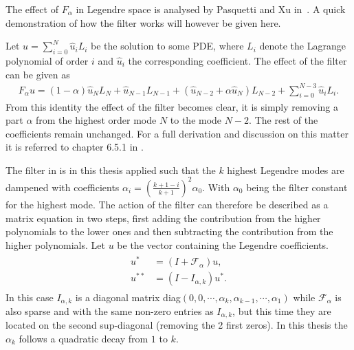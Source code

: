 The effect of $F_{\alpha}$ in Legendre space is analysed
by Pasquetti and Xu in~\cite{Pasquetti}. A quick demonstration of 
how the filter works will however be given here. 

Let $u = \sum_{i=0}^{N} \hat{u}_i L_i$ be the solution to some PDE, where $L_i$ denote the Lagrange
polynomial of order $i$ and $\hat{u}_i$ the corresponding coefficient. The effect of the filter
can be given as 
%
\begin{align}
    F_{\alpha} u = 
    (1-\alpha)\hat{u}_{N}L_{N}
    +\hat{u}_{N-1}L_{N-1} +
    (\hat{u}_{N-2}+\alpha \hat{u}_{N})L_{N-2}
    +\sum_{i=0}^{N-3}\hat{u}_{i}L_{i}.
    \label{eq:filtereffect}
\end{align}
%
From this identity the effect of the filter becomes clear, it is simply removing a part $\alpha $
from the highest order mode $N$ to the mode $N-2$. The rest of the coefficients remain unchanged.
For a full derivation and discussion on this matter it is referred to chapter 6.5.1 in 
\cite{Karniadakis}.

The filter in  is in this thesis applied such that the $k$ highest Legendre modes
are dampened with coefficients $\alpha_i = (\frac{k+1-i}{k+1})^2\alpha_0 $. With $\alpha_0$ being the filter constant
for the highest mode. The action of the filter can therefore be described as 
a matrix equation in two steps, first adding the contribution from the higher polynomials to the 
lower ones and then subtracting the contribution from the higher polynomials. Let $u$ be the 
vector containing the Legendre coefficients.
\begin{align}
    \begin{split}
    u^* &=(I+\mathcal{F}_{\alpha})u, \\
    u^{**} &= (I-I_{\alpha,k})u^*.
    \end{split}
    \label{eq:filterstepwise}
\end{align}
In this case $I_{\alpha,k}$ is a diagonal matrix 
diag$(0,0,\cdots,\alpha_k,\alpha_{k-1},\cdots,\alpha_1)$ 
while $\mathcal{F}_{\alpha}$ is also sparse and with the same non-zero entries as $I_{\alpha,k}$,
but this time they are located on the second sup-diagonal (removing the 2 first zeros). 
In this thesis the $\alpha_k$ follows a quadratic decay from $1$ to $k$.

